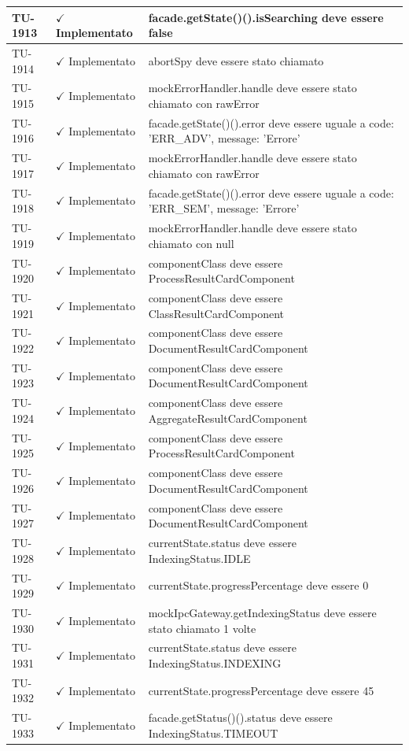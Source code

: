 ﻿\documentclass[a4paper,12pt]{article}
\newcommand{\ok}{\textcolor{green!60!black}{$\checkmark$ Implementato}}
\begin{document}
\begin{longtable}{|p{2cm}|p{3.5cm}|p{9.5cm}|}
\hline
TU-1913 & \ok & facade.getState()().isSearching deve essere false \\
\hline
TU-1914 & \ok & abortSpy deve essere stato chiamato \\
\hline
TU-1915 & \ok & mockErrorHandler.handle deve essere stato chiamato con rawError \\
\hline
TU-1916 & \ok & facade.getState()().error deve essere uguale a { code: 'ERR\_ADV', message: 'Errore' } \\
\hline
TU-1917 & \ok & mockErrorHandler.handle deve essere stato chiamato con rawError \\
\hline
TU-1918 & \ok & facade.getState()().error deve essere uguale a { code: 'ERR\_SEM', message: 'Errore' } \\
\hline
TU-1919 & \ok & mockErrorHandler.handle deve essere stato chiamato con null \\
\hline
TU-1920 & \ok & componentClass deve essere ProcessResultCardComponent \\
\hline
TU-1921 & \ok & componentClass deve essere ClassResultCardComponent \\
\hline
TU-1922 & \ok & componentClass deve essere DocumentResultCardComponent \\
\hline
TU-1923 & \ok & componentClass deve essere DocumentResultCardComponent \\
\hline
TU-1924 & \ok & componentClass deve essere AggregateResultCardComponent \\
\hline
TU-1925 & \ok & componentClass deve essere ProcessResultCardComponent \\
\hline
TU-1926 & \ok & componentClass deve essere DocumentResultCardComponent \\
\hline
TU-1927 & \ok & componentClass deve essere DocumentResultCardComponent \\
\hline
TU-1928 & \ok & currentState.status deve essere IndexingStatus.IDLE \\
\hline
TU-1929 & \ok & currentState.progressPercentage deve essere 0 \\
\hline
TU-1930 & \ok & mockIpcGateway.getIndexingStatus deve essere stato chiamato 1 volte \\
\hline
TU-1931 & \ok & currentState.status deve essere IndexingStatus.INDEXING \\
\hline
TU-1932 & \ok & currentState.progressPercentage deve essere 45 \\
\hline
TU-1933 & \ok & facade.getStatus()().status deve essere IndexingStatus.TIMEOUT \\

\end{longtable}
\end{document}
